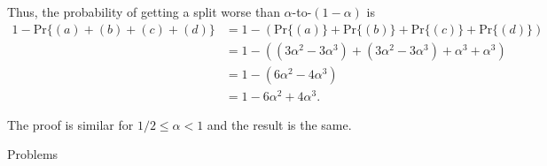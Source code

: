 \documentclass{report}
\makeatletter
\renewenvironment{framed}{%
 \def\FrameCommand##1{\hskip\@totalleftmargin
 \fboxsep=\FrameSep\fbox{##1}}%
 \MakeFramed {\advance\hsize-\width
   \@totalleftmargin\z@ \linewidth\hsize
   \@setminipage}}%
 {\par\unskip\endMakeFramed}
\makeatother
\begin{document}
\begin{enumerate}
\begin{framed}
Thus, the probability of getting a split worse than $\alpha$-to-$(1 - \alpha)$ is
\begin{equation*}
\begin{aligned}
  1 - \text{Pr}\{(a) + (b) + (c) + (d)\}
  &= 1 - \left(\text{Pr}\{(a)\} + \text{Pr}\{(b)\} + \text{Pr}\{(c)\} + \text{Pr}\{(d)\}\right)\\
  &= 1 - \left((3 \alpha^2 - 3 \alpha^3) + (3 \alpha^2 - 3 \alpha^3) + \alpha^3 + \alpha^3\right)\\
  &= 1 - (6 \alpha^2 - 4 \alpha^3)\\
  &= 1 - 6 \alpha^2 + 4 \alpha^3.
\end{aligned}
\end{equation*}

The proof is similar for $1/2 \le \alpha < 1$ and the result is the same.
\end{framed}

\end{enumerate}

\newpage

{\large Problems}
\end{document}
